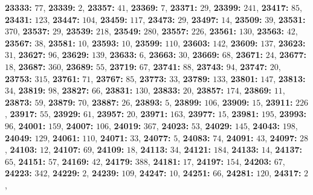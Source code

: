 \textsf{\bfseries 23333:} $77$, \textsf{\bfseries 23339:} $2$, \textsf{\bfseries 23357:} $41$, \textsf{\bfseries 23369:} $7$, \textsf{\bfseries 23371:} $29$, \textsf{\bfseries 23399:} $241$, \textsf{\bfseries 23417:} $85$, \textsf{\bfseries 23431:} $123$, \textsf{\bfseries 23447:} $104$, \textsf{\bfseries 23459:} $117$, \textsf{\bfseries 23473:} $29$, \textsf{\bfseries 23497:} $14$, \textsf{\bfseries 23509:} $39$, \textsf{\bfseries 23531:} $370$, \textsf{\bfseries 23537:} $29$, \textsf{\bfseries 23539:} $218$, \textsf{\bfseries 23549:} $280$, \textsf{\bfseries 23557:} $226$, \textsf{\bfseries 23561:} $130$, \textsf{\bfseries 23563:} $42$, \textsf{\bfseries 23567:} $38$, \textsf{\bfseries 23581:} $10$, \textsf{\bfseries 23593:} $10$, \textsf{\bfseries 23599:} $110$, \textsf{\bfseries 23603:} $142$, \textsf{\bfseries 23609:} $137$, \textsf{\bfseries 23623:} $31$, \textsf{\bfseries 23627:} $96$, \textsf{\bfseries 23629:} $139$, \textsf{\bfseries 23633:} $6$, \textsf{\bfseries 23663:} $30$, \textsf{\bfseries 23669:} $68$, \textsf{\bfseries 23671:} $24$, \textsf{\bfseries 23677:} $18$, \textsf{\bfseries 23687:} $360$, \textsf{\bfseries 23689:} $55$, \textsf{\bfseries 23719:} $67$, \textsf{\bfseries 23741:} $88$, \textsf{\bfseries 23743:} $94$, \textsf{\bfseries 23747:} $20$, \textsf{\bfseries 23753:} $315$, \textsf{\bfseries 23761:} $71$, \textsf{\bfseries 23767:} $85$, \textsf{\bfseries 23773:} $33$, \textsf{\bfseries 23789:} $133$, \textsf{\bfseries 23801:} $147$, \textsf{\bfseries 23813:} $34$, \textsf{\bfseries 23819:} $98$, \textsf{\bfseries 23827:} $66$, \textsf{\bfseries 23831:} $130$, \textsf{\bfseries 23833:} $20$, \textsf{\bfseries 23857:} $174$, \textsf{\bfseries 23869:} $11$, \textsf{\bfseries 23873:} $59$, \textsf{\bfseries 23879:} $70$, \textsf{\bfseries 23887:} $26$, \textsf{\bfseries 23893:} $5$, \textsf{\bfseries 23899:} $106$, \textsf{\bfseries 23909:} $15$, \textsf{\bfseries 23911:} $226$, \textsf{\bfseries 23917:} $55$, \textsf{\bfseries 23929:} $61$, \textsf{\bfseries 23957:} $20$, \textsf{\bfseries 23971:} $163$, \textsf{\bfseries 23977:} $15$, \textsf{\bfseries 23981:} $195$, \textsf{\bfseries 23993:} $96$, \textsf{\bfseries 24001:} $159$, \textsf{\bfseries 24007:} $106$, \textsf{\bfseries 24019:} $367$, \textsf{\bfseries 24023:} $53$, \textsf{\bfseries 24029:} $145$, \textsf{\bfseries 24043:} $198$, \textsf{\bfseries 24049:} $129$, \textsf{\bfseries 24061:} $110$, \textsf{\bfseries 24071:} $33$, \textsf{\bfseries 24077:} $5$, \textsf{\bfseries 24083:} $74$, \textsf{\bfseries 24091:} $43$, \textsf{\bfseries 24097:} $28$, \textsf{\bfseries 24103:} $12$, \textsf{\bfseries 24107:} $69$, \textsf{\bfseries 24109:} $18$, \textsf{\bfseries 24113:} $34$, \textsf{\bfseries 24121:} $184$, \textsf{\bfseries 24133:} $14$, \textsf{\bfseries 24137:} $65$, \textsf{\bfseries 24151:} $57$, \textsf{\bfseries 24169:} $42$, \textsf{\bfseries 24179:} $388$, \textsf{\bfseries 24181:} $17$, \textsf{\bfseries 24197:} $154$, \textsf{\bfseries 24203:} $67$, \textsf{\bfseries 24223:} $342$, \textsf{\bfseries 24229:} $2$, \textsf{\bfseries 24239:} $109$, \textsf{\bfseries 24247:} $10$, \textsf{\bfseries 24251:} $66$, \textsf{\bfseries 24281:} $120$, \textsf{\bfseries 24317:} $2$, 
